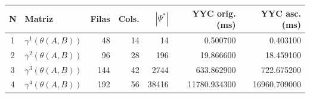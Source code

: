 \begin{tabular}{c l r r r r r}
\toprule
N & Matriz & Filas & Cols. & $|\Psi^*|$ & YYC orig. (ms) & YYC asc. (ms) \\
\midrule
1 & $\gamma^{1}(\theta(A,B))$ & 48 & 14 & 14 & 0.500700 & 0.403100 \\
2 & $\gamma^{2}(\theta(A,B))$ & 96 & 28 & 196 & 19.866600 & 18.459100 \\
3 & $\gamma^{3}(\theta(A,B))$ & 144 & 42 & 2744 & 633.862900 & 722.675200 \\
4 & $\gamma^{4}(\theta(A,B))$ & 192 & 56 & 38416 & 11780.934300 & 16960.709000 \\
\bottomrule
\end{tabular}
